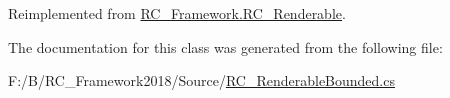 Reimplemented from \mbox{\hyperlink{class_r_c___framework_1_1_r_c___renderable_acc26db34e382a25a989c4c0dd0354b23}{R\+C\+\_\+\+Framework.\+R\+C\+\_\+\+Renderable}}.



The documentation for this class was generated from the following file\+:\begin{DoxyCompactItemize}
\item 
F\+:/\+B/\+R\+C\+\_\+\+Framework2018/\+Source/\mbox{\hyperlink{_r_c___renderable_bounded_8cs}{R\+C\+\_\+\+Renderable\+Bounded.\+cs}}\end{DoxyCompactItemize}

